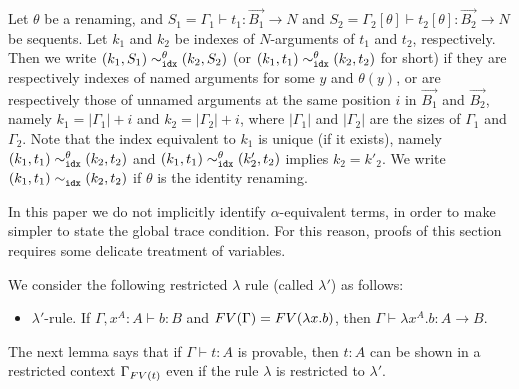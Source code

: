 Let $\theta$ be a renaming, and 
$S_1 = \Gamma_1\vdash t_1:\vec{B_1}\rightarrow N$
and $S_2 = \Gamma_2[\theta]\vdash t_2[\theta]:\vec{B_2}\rightarrow N$ be sequents. 
Let $k_1$ and $k_2$ be indexes of $N$-arguments of $t_1$ and $t_2$, respectively. 
Then we write $(k_1,S_1) \sim^{\theta}_{{\tt idx}} (k_2,S_2)$ (or $(k_1,t_1) \sim^{\theta}_{{\tt idx}} (k_2,t_2)$ for short)
if they are respectively indexes of named arguments for some $y$ and $\theta(y)$, or
are respectively those of unnamed arguments at the same position $i$ in $\vec{B_1}$ and $\vec{B_2}$,
namely $k_1=|\Gamma_1|+i$ and $k_2=|\Gamma_2|+i$,
where $|\Gamma_1|$ and $|\Gamma_2|$ are the sizes of $\Gamma_1$ and $\Gamma_2$. 
Note that the index equivalent to $k_1$ is unique (if it exists), namely 
$(k_1,t_1) \sim^{\theta}_{{\tt idx}} (k_2,t_2)$ and $(k_1,t_1) \sim^{\theta}_{{\tt idx}} (k'_2,t_2)$ implies $k_2=k'_2$.
We write $(k_1,t_1) \sim^{}_{{\tt idx}} (k_2,t_2)$ if $\theta$ is the identity renaming. 

In this paper we do not implicitly identify $\alpha$-equivalent terms,
in order to make simpler to state the global trace condition.
For this reason, proofs of this section requires some delicate treatment of variables.

We consider the following restricted $\lambda$ rule (called $\lambda'$) as follows:
\begin{itemize}
\item
  $\lambda'$-rule.
  If $\Gamma, x^A:A \vdash b: B$ and ${{\relax FV}}(\Gamma) = {{\relax FV}}(\lambda x.b)$, 
  then $ \Gamma \vdash \lambda x^A.b :A \rightarrow B$.
\end{itemize}

The next lemma says that if $\Gamma\vdash t:A$ is provable,
then $t:A$ can be shown in a restricted context $\Gamma_{{{\relax FV}}(t)}$
even if the rule $\lambda$ is restricted to $\lambda'$. 

